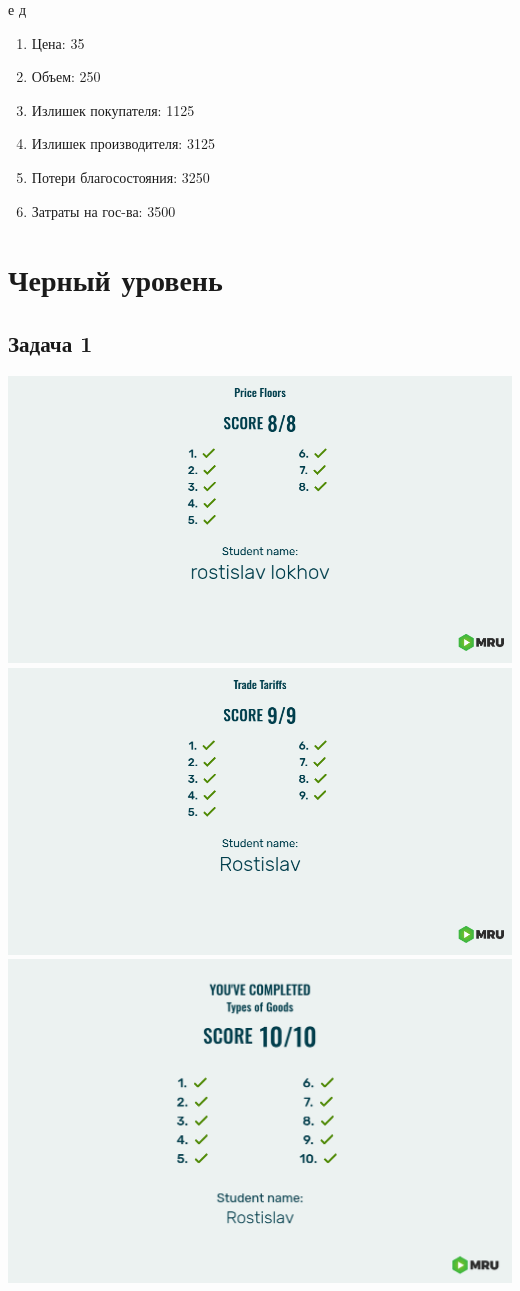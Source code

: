 \documentclass[a4paper,12pt]{article}
\begin{document}
е
д
\begin{enumerate}
    \item Цена: 35
    \item Объем: 250
    \item Излишек покупателя: 1125
    \item Излишек производителя: 3125
    \item Потери благосостояния: 3250
    \item Затраты на гос-ва: 3500
\end{enumerate}


\section{Черный уровень}
\subsection{Задача 1}
\includegraphics[scale=0.15]{graphs/3.2.jpg}
\includegraphics[scale=0.15]{graphs/3.3.jpg}
\includegraphics[scale=0.1]{graphs/3.4.jpg}
\end{document}
